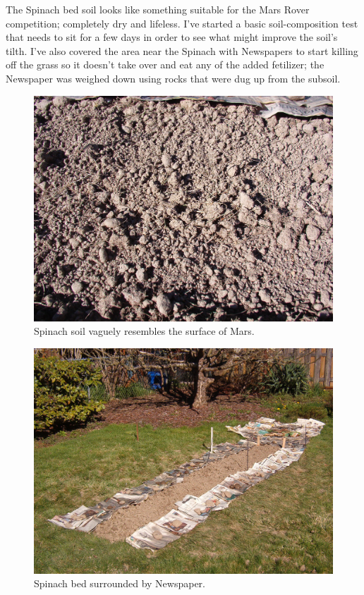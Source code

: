 \documentclass{article}
\begin{document}
The Spinach bed soil looks like something suitable for the Mars Rover competition; completely dry and lifeless. I've started a basic soil-composition test that needs to sit for a few days in order to see what might improve the soil's tilth. I've also covered the area near the Spinach with Newspapers to start killing off the grass so it doesn't take over and eat any of the added fetilizer; the Newspaper was weighed down using rocks that were dug up from the subsoil.
\begin{figure}
\protect \includegraphics[scale=0.20]{pics/0318_spinach2.jpg}
\caption{Spinach soil vaguely resembles the surface of Mars.}
\end{figure}
\begin{figure}
\protect \includegraphics[scale=0.20]{pics/0318_spinach1.jpg}
\caption{Spinach bed surrounded by Newspaper.}
\end{figure}
\end{document}
